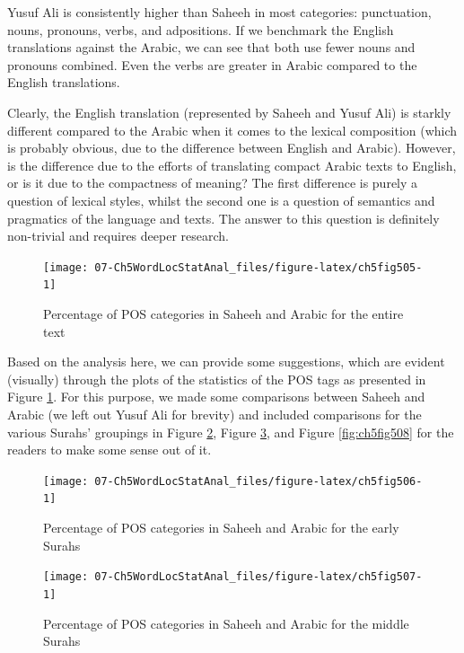 \documentclass[
]{article}
\begin{document}
Yusuf Ali is consistently higher than Saheeh in most categories: punctuation, nouns, pronouns, verbs, and adpositions. If we benchmark the English translations against the Arabic, we can see that both use fewer nouns and pronouns combined. Even the verbs are greater in Arabic compared to the English translations.

Clearly, the English translation (represented by Saheeh and Yusuf Ali) is starkly different compared to the Arabic when it comes to the lexical composition (which is probably obvious, due to the difference between English and Arabic). However, is the difference due to the efforts of translating compact Arabic texts to English, or is it due to the compactness of meaning? The first difference is purely a question of lexical styles, whilst the second one is a question of semantics and pragmatics of the language and texts. The answer to this question is definitely non-trivial and requires deeper research.

\begin{figure}

{\centering \texttt{[image: 07-Ch5WordLocStatAnal\_files/figure-latex/ch5fig505-1]} 

}

\caption{Percentage of POS categories in Saheeh and Arabic for the entire text}\label{fig:ch5fig505}
\end{figure}

Based on the analysis here, we can provide some suggestions, which are evident (visually) through the plots of the statistics of the POS tags as presented in Figure \ref{fig:ch5fig505}. For this purpose, we made some comparisons between Saheeh and Arabic (we left out Yusuf Ali for brevity) and included comparisons for the various Surahs' groupings in Figure \ref{fig:ch5fig506}, Figure \ref{fig:ch5fig507}, and Figure \ref{fig:ch5fig508} for the readers to make some sense out of it.

\begin{figure}

{\centering \texttt{[image: 07-Ch5WordLocStatAnal\_files/figure-latex/ch5fig506-1]} 

}

\caption{Percentage of POS categories in Saheeh and Arabic for the early Surahs}\label{fig:ch5fig506}
\end{figure}

\begin{figure}

{\centering \texttt{[image: 07-Ch5WordLocStatAnal\_files/figure-latex/ch5fig507-1]} 

}

\caption{Percentage of POS categories in Saheeh and Arabic for the middle Surahs}\label{fig:ch5fig507}
\end{figure}
\end{document}

